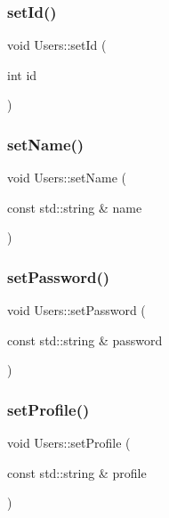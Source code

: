 \mbox{\label{class_users_a296ca7955e48886c4e462f8fa082346a}} 
\subsubsection{\texorpdfstring{set\+Id()}{setId()}}
{\footnotesize\ttfamily void Users\+::set\+Id (\begin{DoxyParamCaption}\item[{int}]{id }\end{DoxyParamCaption})}

\mbox{\label{class_users_a5b1caf71b472b3215f232de13094b853}} 
\subsubsection{\texorpdfstring{set\+Name()}{setName()}}
{\footnotesize\ttfamily void Users\+::set\+Name (\begin{DoxyParamCaption}\item[{const std\+::string \&}]{name }\end{DoxyParamCaption})}

\mbox{\label{class_users_a6e42d23b9d8e0664e93fdbdff4e36dad}} 
\subsubsection{\texorpdfstring{set\+Password()}{setPassword()}}
{\footnotesize\ttfamily void Users\+::set\+Password (\begin{DoxyParamCaption}\item[{const std\+::string \&}]{password }\end{DoxyParamCaption})}

\mbox{\label{class_users_a8a7ee3fff2451e53623de00ec131e29c}} 
\subsubsection{\texorpdfstring{set\+Profile()}{setProfile()}}
{\footnotesize\ttfamily void Users\+::set\+Profile (\begin{DoxyParamCaption}\item[{const std\+::string \&}]{profile }\end{DoxyParamCaption})}

